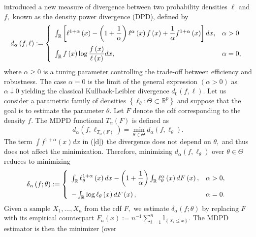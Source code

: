 \documentclass[reqno,openbib,runningheads,a4paper,12pt]{amsart}%
\begin{document}
\noindent\cite{Basu98} introduced a new measure of divergence between two
probability densities $\ell$ and $f,$ known as the density power divergence
(DPD), defined by
\begin{equation}
d_{\alpha}\left(  f,\ell\right)  :=\left\{
\begin{array}
[c]{ll}%
\int_{\mathbb{R}}\left[  \ell^{1+\alpha}\left(  x\right)  -\left(  1+\dfrac
{1}{\alpha}\right)  \ell^{\alpha}\left(  x\right)  f\left(  x\right)
+\dfrac{1}{\alpha}f^{1+\alpha}\left(  x\right)  \right]  dx, & \alpha
>0\medskip\\
\int_{\mathbb{R}}f\left(  x\right)  \log\dfrac{f\left(  x\right)  }%
{\ell\left(  x\right)  }dx, & \alpha=0,
\end{array}
\right.  \label{d}%
\end{equation}
where $\alpha\geq0$ is a tuning parameter controlling the trade-off between
efficiency and robustness. The case $\alpha=0$ is the limit of the general
expression $\left(  \alpha>0\right)  $ as $\alpha\downarrow0$ yielding the
classical Kullback-Leibler divergence\textbf{ }$d_{0}\left(  f,\ell\right)  .$
Let us consider a parametric family of densities $\left\{  \ell_{\theta
}:\Theta\subset\mathbb{R}^{p}\right\}  $ and suppose that the goal is to
estimate the parameter $\theta.$ Let $F$ denote the cdf corresponding to the
density $f.$ The MDPD functional $T_{\alpha}\left(  F\right)  $ is defined as
\[
d_{\alpha}\left(  f,\ell_{T_{\alpha}\left(  F\right)  }\right)  =\min
_{\theta\in\Theta}d_{\alpha}\left(  f,\ell_{\theta}\right)  .
\]
The term $\int f^{1+\alpha}\left(  x\right)  dx$ in $\left(  \ref{d}\right)  $
the divergence does not depend on $\theta,$ and thus does not affect the
minimization. Therefore, minimizing $d_{\alpha}\left(  f,\ell_{\theta}\right)
$ over $\theta\in\Theta$ reduces to minimizing
\[
\delta_{\alpha}\left(  f;\theta\right)  :=\left\{
\begin{array}
[c]{lc}%
\int_{\mathbb{R}}\ell_{\theta}^{1+\alpha}\left(  x\right)  dx-\left(
1+\dfrac{1}{\alpha}\right)  \int_{\mathbb{R}}\ell_{\theta}^{\alpha}\left(
x\right)  dF\left(  x\right)  , & \alpha>0,\medskip\\
-\int_{\mathbb{R}}\log\ell_{\theta}\left(  x\right)  dF\left(  x\right)  , &
\alpha=0.
\end{array}
\right.
\]
Given a sample $X_{1},...,X_{n}$ from the cdf $F,$ we estimate $\delta
_{\alpha}\left(  f;\theta\right)  $ by replacing $F$ with its empirical
counterpart $F_{n}\left(  x\right)  :=n^{-1}\sum_{i=1}^{n}\mathbb{I}_{\left\{
X_{i}\leq x\right\}  }.$ The MDPD estimator is then the minimizer (over
\end{document}
